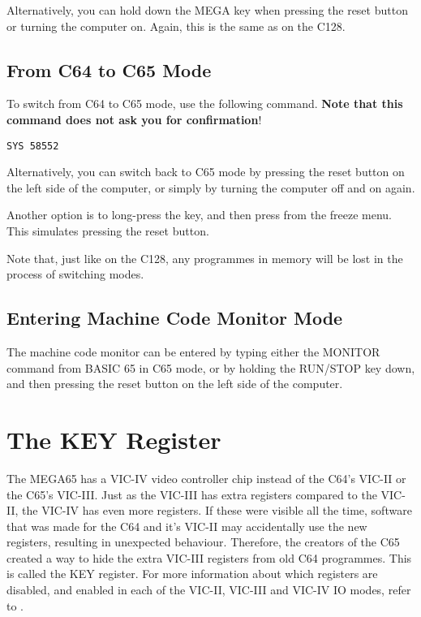 Alternatively, you can hold down the MEGA key when pressing the reset button or turning the computer on. Again,
this is the same as on the C128.

\subsection{From C64 to C65 Mode}

To switch from C64 to C65 mode, use the following command. {\bf Note that this command does not ask you for
confirmation}!

\begin{tcolorbox}[colback=black,coltext=white]
\verbatimfont{\codefont}
\begin{verbatim}
SYS 58552
\end{verbatim}
\end{tcolorbox}

Alternatively, you can switch back to C65 mode by pressing the reset
button on the left side of the computer, or simply by turning the
computer off and on again.

Another option is to long-press the  key, and then press 
from the freeze menu.  This simulates pressing the reset button.

Note that, just like on the C128, any programmes in memory will be
lost in the process of switching modes.

\subsection{Entering Machine Code Monitor Mode}

The machine code monitor can be entered by typing either the MONITOR
command from BASIC 65 in C65 mode, or by holding the RUN/STOP key
down, and then pressing the reset button on the left side of the
computer.

\section{The KEY Register}

The MEGA65 has a VIC-IV video controller chip instead of the C64's VIC-II or
the C65's VIC-III.  Just as the VIC-III has extra registers compared to the
VIC-II, the VIC-IV has even more registers.  If these were visible all the time,
software that was made for the C64 and it's VIC-II may accidentally use the
new registers, resulting in unexpected behaviour.  Therefore, the
creators of the C65 created a way to hide the extra VIC-III registers from old
C64 programmes. This is called the KEY register. For more information
about which registers are disabled, and enabled in each of the
VIC-II, VIC-III and VIC-IV IO modes, refer to .


